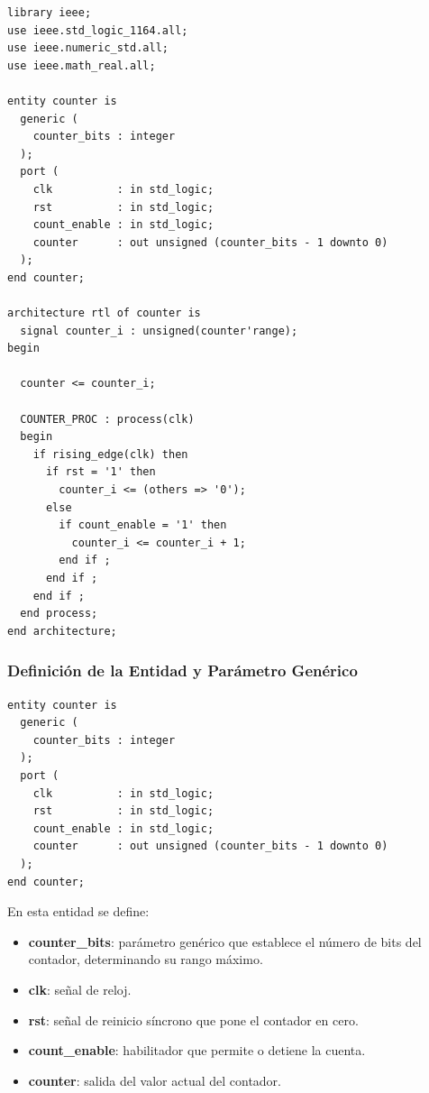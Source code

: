 \documentclass[a4paper,12pt]{article}
\begin{document}
\begin{lstlisting}[caption={Código completo del módulo Contador}, label={lst:counter_full}]
library ieee;
use ieee.std_logic_1164.all;
use ieee.numeric_std.all;
use ieee.math_real.all;

entity counter is
  generic (
    counter_bits : integer
  );
  port (
    clk          : in std_logic;
    rst          : in std_logic;
    count_enable : in std_logic;
    counter      : out unsigned (counter_bits - 1 downto 0)
  );
end counter;

architecture rtl of counter is
  signal counter_i : unsigned(counter'range);
begin

  counter <= counter_i;

  COUNTER_PROC : process(clk)
  begin
    if rising_edge(clk) then  
      if rst = '1' then
        counter_i <= (others => '0');
      else
        if count_enable = '1' then
          counter_i <= counter_i + 1;
        end if ;
      end if ;
    end if ;
  end process;
end architecture;
\end{lstlisting}

\subsubsection{Definición de la Entidad y Parámetro Genérico}

\begin{lstlisting}[caption={Entidad del módulo Contador}, label={lst:counter_entity}]
entity counter is
  generic (
    counter_bits : integer
  );
  port (
    clk          : in std_logic;
    rst          : in std_logic;
    count_enable : in std_logic;
    counter      : out unsigned (counter_bits - 1 downto 0)
  );
end counter;
\end{lstlisting}

En esta entidad se define:
\begin{itemize}
    \item \textbf{counter\_bits}: parámetro genérico que establece el número de bits del contador, determinando su rango máximo.
    \item \textbf{clk}: señal de reloj.
    \item \textbf{rst}: señal de reinicio síncrono que pone el contador en cero.
    \item \textbf{count\_enable}: habilitador que permite o detiene la cuenta.
    \item \textbf{counter}: salida del valor actual del contador.
\end{itemize}
\end{document}
